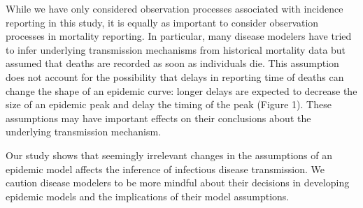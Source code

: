 \documentclass{article}\usepackage[]{graphicx}\usepackage[]{color}
\begin{document}
While we have only considered observation processes associated with incidence 
reporting in this study, it is equally as important to consider observation
processes in mortality reporting. In particular, many disease modelers have
tried to infer underlying transmission mechanisms from historical mortality 
data but assumed that deaths are recorded as soon as individuals die. This assumption
does not account for the possibility that delays in reporting time of deaths can
change the shape of an epidemic curve: longer delays are expected to decrease
the size of an epidemic peak and delay the timing of the peak (Figure 1). 
These assumptions may have important effects on their conclusions about the underlying 
transmission mechanism.

Our study shows that seemingly irrelevant changes in the assumptions of an epidemic
model affects the inference of infectious disease transmission.
We caution disease modelers to be more mindful about their decisions in developing
epidemic models and the implications of their model assumptions.


\end{document}
